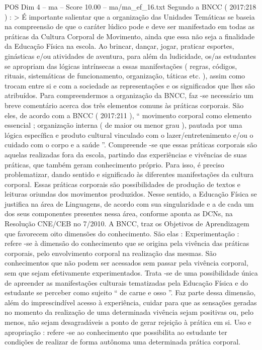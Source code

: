 \begin{textsample}{POS Dim 4 – ma – Score 10.00 – ma/ma\_ef\_16.txt}
Segundo a BNCC ( 2017:218 ) : > É importante salientar que a organização das Unidades Temáticas se baseia na compreensão de que o caráter lúdico pode e deve ser manifestado em todas as práticas da Cultura Corporal de Movimento, ainda que essa não seja a finalidade da Educação Física na escola.
Ao brincar, dançar, jogar, praticar esportes, ginásticas e/ou atividades de aventura, para além da ludicidade, os/as estudantes se apropriam das lógicas intrínsecas a essas manifestações ( regras, códigos, rituais, sistemáticas de funcionamento, organização, táticas etc. ), assim como trocam entre si e com a sociedade as representações e os significados que lhes são atribuídos.
Para compreendermos a organização da BNCC, faz -se necessário um breve comentário acerca dos três elementos comuns às práticas corporais.
São eles, de acordo com a BNCC ( 2017:211 ), “ movimento corporal como elemento essencial ; organização interna ( de maior ou menor grau ), pautada por uma lógica específica e produto cultural vinculado com o lazer/entretenimento e/ou o cuidado com o corpo e a saúde ”.
Compreende -se que essas práticas corporais são aquelas realizadas fora da escola, partindo das experiências e vivências de suas práticas, que também geram conhecimento próprio.
Para isso, é preciso problematizar, dando sentido e significado às diferentes manifestações da cultura corporal.
Essas práticas corporais são possibilidades de produção de textos e leituras oriundas dos movimentos produzidos.
Nesse sentido, a Educação Física se justifica na área de Linguagens, de acordo com sua singularidade e a de cada um dos seus componentes presentes nessa área, conforme aponta as DCNs, na Resolução CNE/CEB no 7/2010.
A BNCC, traz os Objetivos de Aprendizagem que favorecem oito dimensões do conhecimento.
São elas : Experimentação : refere -se à dimensão do conhecimento que se origina pela vivência das práticas corporais, pelo envolvimento corporal na realização das mesmas.
São conhecimentos que não podem ser acessados sem passar pela vivência corporal, sem que sejam efetivamente experimentados.
Trata -se de uma possibilidade única de apreender as manifestações culturais tematizadas pela Educação Física e do estudante se perceber como sujeito “ de carne e osso ”.
Faz parte dessa dimensão, além do imprescindível acesso à experiência, cuidar para que as sensações geradas no momento da realização de uma determinada vivência sejam positivas ou, pelo menos, não sejam desagradáveis a ponto de gerar rejeição à prática em si.
Uso e apropriação : refere -se ao conhecimento que possibilita ao estudante ter condições de realizar de forma autônoma uma determinada prática corporal.

\end{textsample}
